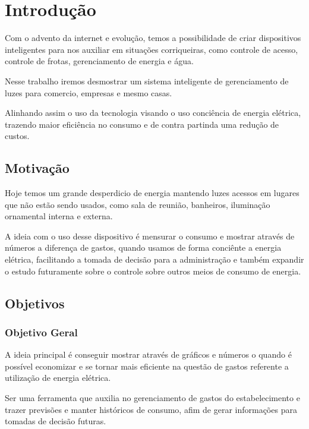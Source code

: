 \documentclass[openright]{normas-utf-tex} %
\begin{document}
\setcounter{page}{12}


\chapter{Introdução}


Com o advento da internet e evolução, temos a possibilidade de criar dispositivos inteligentes \cite{Novatec} para nos auxiliar em situações corriqueiras, como controle de acesso, controle de frotas, gerenciamento de energia e água.

Nesse trabalho iremos desmostrar um sistema inteligente de gerenciamento de luzes para comercio, empresas e mesmo casas.

Alinhando assim o uso da tecnologia visando o uso conciência de energia elétrica, trazendo maior eficiência no consumo e de contra partinda uma redução de custos.

\section{Motivação}

Hoje temos um grande desperdicio de energia mantendo luzes acessos em lugares que não estão sendo usados, como sala de reunião, banheiros, iluminação ornamental interna e externa.

A ideia com o uso desse dispositivo é mensurar o consumo e mostrar através de números a diferença de gastos, quando usamos de forma conciênte a energia elétrica, facilitando a tomada de decisão para a administração e também expandir o estudo futuramente sobre o controle sobre outros meios de consumo de energia.

\section{Objetivos}

\subsection{Objetivo Geral}

A ideia principal é conseguir mostrar através de gráficos e números o quando é possível economizar e se tornar mais eficiente na questão de gastos referente a utilização de energia elétrica.

Ser uma ferramenta que auxilia no gerenciamento de gastos do estabelecimento e trazer previsões e manter históricos de consumo, afim de gerar informações para tomadas de decisão futuras.
\end{document}
